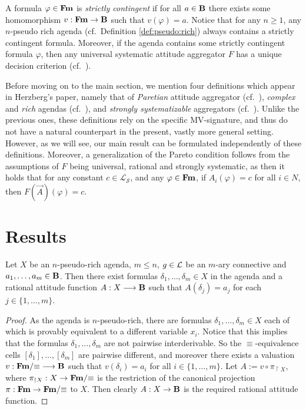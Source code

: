 \documentclass{llncs}
\numberwithin{equation}{section}
\newcommand{\s}{\mathcal{S}}
\newcommand{\Ls}{\mathcal{L}_{\s}}
\begin{document}
A formula $\varphi\in\mathbf{Fm}$ is \emph{strictly contingent} if for all $a\in\mathbf{B}$ there exists some homomorphism $v:\mathbf{Fm}\rightarrow\mathbf{B}$ such that $v(\varphi)=a$.
Notice that for any $n\geq 1$, any $n$-pseudo rich agenda (cf.\ Definition \ref{def:pseudo:rich}) always contains a strictly contingent formula.
Moreover, if the agenda contains some strictly contingent formula $\varphi$, then any universal systematic attitude aggregator $F$ has a unique decision criterion (cf.\ \cite[Remark 3.5]{He13}).\label{page:unique:decision:criterion}

Before moving on to the main section, we mention four definitions which appear in Herzberg's paper, namely that of \emph{Paretian} attitude aggregator (cf.\ \cite[Definition 3.7]{He13}), \emph{complex} and \emph{rich} agendas (cf.\ \cite[Definition 3.8]{He13}), and \emph{strongly systematizable} aggregators (cf.\ \cite[Definition 3.9]{He13}). Unlike the previous ones, these definitions rely on the specific MV-signature, and thus do not have a natural counterpart in the present, vastly more general setting. However, as we will see, our main result can be formulated independently of these definitions.
Moreover, a generalization of the Pareto condition follows from the assumptions of  $F$ being universal, rational and strongly systematic, as then it holds that for any constant $c\in\Ls$, and any $\varphi\in\mathbf{Fm}$, if $A_i(\varphi)=c$ for all $i\in N$, then $F(\vec{A})(\varphi)=c$.

\section{Results}
\label{Sec:Results}
\begin{lemma}
Let $X$ be an $n$-pseudo-rich agenda, $m\leq n$, $g\in \mathcal{L}$ be an $m$-ary connective and $a_{1},\dots,a_{m}\in \mathbf{B}$.
Then there exist formulas $\delta_{1},\dots,\delta_{m}\in X$ in the agenda and a rational attitude function $A:X\longrightarrow \mathbf{B}$ such that $A(\delta_{j})=a_{j}$ for each $j\in \{1,\dots,m\}$.
\end{lemma}
\begin{proof}
As the agenda is $n$-pseudo-rich, there are formulas $\delta_{1},\dots,\delta_{m}\in X$ each of which is provably equivalent to a different variable $x_i$. Notice that this implies that the formulas $\delta_1, \ldots, \delta_m$ are not pairwise interderivable. So the $\equiv$-equivalence cells $[\delta_{1}],\dots, [\delta_{m}]$ are pairwise different, and moreover there exists a valuation $v:\mathbf{Fm}/{\equiv}\longrightarrow \mathbf{B}$ such that $v(\delta_{i})=a_{i}$ for all $i\in \{1,\dots,m\}$.
Let $A:=v\circ\pi_{\upharpoonright X}$, where $\pi_{\upharpoonright X}:X\rightarrow\mathbf{Fm}/{\equiv}$ is the restriction of the canonical projection $\pi:\mathbf{Fm}\rightarrow\mathbf{Fm}/{\equiv}$ to $X$. Then clearly $A:X\rightarrow\mathbf{B}$ is the required rational attitude function.
\end{proof}
\end{document}
